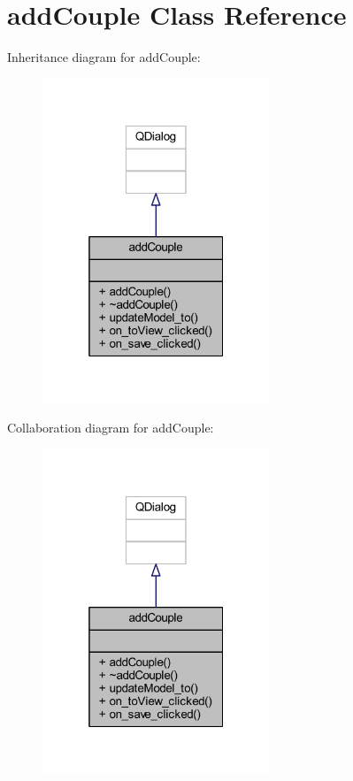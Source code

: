 \hypertarget{classadd_couple}{}\section{add\+Couple Class Reference}
\label{classadd_couple}


Inheritance diagram for add\+Couple\+:\nopagebreak
\begin{figure}[H]
\begin{center}
\leavevmode
\includegraphics[width=193pt]{classadd_couple__inherit__graph}
\end{center}
\end{figure}


Collaboration diagram for add\+Couple\+:\nopagebreak
\begin{figure}[H]
\begin{center}
\leavevmode
\includegraphics[width=193pt]{classadd_couple__coll__graph}
\end{center}
\end{figure}
